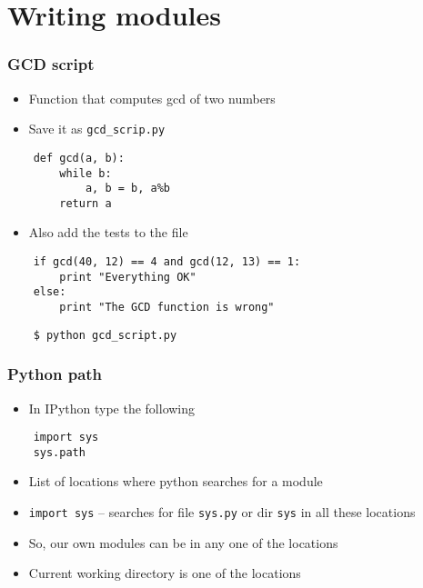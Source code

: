 \section{Writing modules}

\begin{frame}[fragile]
  \frametitle{GCD script}
  \begin{itemize}
  \item Function that computes gcd of two numbers
  \item Save it as \texttt{gcd\_scrip.py}
  \end{itemize}
  \begin{lstlisting}
    def gcd(a, b):
        while b:
            a, b = b, a%b
        return a
  \end{lstlisting}
  \begin{itemize}
  \item Also add the tests to the file
  \end{itemize}
  \begin{lstlisting}
    if gcd(40, 12) == 4 and gcd(12, 13) == 1:
        print "Everything OK"
    else:
        print "The GCD function is wrong"
  \end{lstlisting}
  \begin{lstlisting}
    $ python gcd_script.py
  \end{lstlisting} %
\end{frame}

\begin{frame}[fragile]
  \frametitle{Python path}
  \begin{itemize}
  \item In IPython type the following
  \end{itemize}
  \begin{lstlisting}
    import sys
    sys.path
  \end{lstlisting}
  \begin{itemize}
  \item List of locations where python searches for a module
  \item \texttt{import sys} -- searches for file \texttt{sys.py} or
    dir \texttt{sys} in all these locations
  \item So, our own modules can be in any one of the locations
  \item Current working directory is one of the locations
  \end{itemize}
\end{frame}

